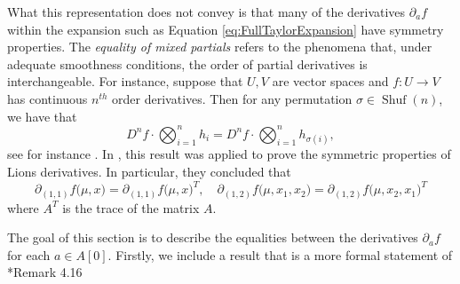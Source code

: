 \documentclass[a4paper,11pt,twoside]{article}
\numberwithin{equation}{section}
\theoremstyle{plain}
\newcommand{\bR}{\mathbb{R}}
\DeclareMathOperator{\Shuf}{Shuf}
\newcommand{\1}{\mathbbm{1}}
\begin{document}
	
	What this representation does not convey is that many of the derivatives $\partial_a f$ within the expansion such as Equation \eqref{eq:FullTaylorExpansion} have symmetry properties. The \emph{equality of mixed partials} refers to the phenomena that, under adequate smoothness conditions, the order of partial derivatives is interchangeable. For instance, suppose that $U, V$ are vector spaces and $f: U \to V$ has continuous $n^{th}$ order derivatives. Then for any permutation $\sigma \in \Shuf(n)$, we have that
	\begin{equation}
		\label{eq:shuffle_FrechetDeriv}
		D^n f \cdot \bigotimes_{i=1}^n h_i = D^n f \cdot \bigotimes_{i=1}^n h_{\sigma(i)}, 
	\end{equation}
	see for instance \cite{Rodney2012Calculus}. In \cite{CarmonaDelarue2017book1}, this result was applied to prove the symmetric properties of Lions derivatives. In particular, they concluded that
	\begin{equation}
		\label{eq:CD-Schwarz-1}
		\partial_{(1,1)} f\Big( \mu, x \Big) = \partial_{(1,1)} f \Big( \mu, x \Big)^T, 
		\quad
		\partial_{(1,2)} f \Big( \mu, x_1, x_2 \Big) = \partial_{(1,2)} f\Big( \mu, x_2, x_1 \Big)^{T}
	\end{equation}
	where $A^T$ is the trace of the matrix $A$. 
	
	The goal of this section is to describe the equalities between the derivatives $\partial_a f$ for each $a\in A[0]$. Firstly, we include a result that is a more formal statement of \cite{CarmonaDelarue2017book2}*{Remark 4.16}
	
\end{document}

